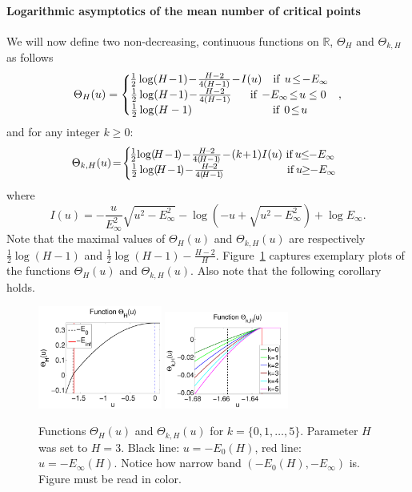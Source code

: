 \documentclass[twoside]{article}
\begin{document}
\paragraph{Logarithmic asymptotics of the mean number of critical points}
We will now define two non-decreasing, continuous functions on $\mathbb{R}$, $\Theta_H$ and $\Theta_{k,H}$ as follows
\[\Theta_H(u) = \left \{
  \begin{tabular}{c}
  $\!\!\!\!\frac{1}{2}\log(H\!-\!1) \!-\! \frac{H-2}{4(H-1)} \!-\! I(u)$ $\:\:\:$if$\:\:$$u \!\leq\! -E_{\infty}$\\
  $\!\!\!\!\!\frac{1}{2}\log(H\!-\!1) \!-\! \frac{H-2}{4(H-1)}$ $\:\:\:\:\:\:$if$\:\:$$-E_{\infty} \!\leq\! u \leq 0$\\
  $\!\!\!\!\!\!\!\!\!\!\!\!\!\!\!\frac{1}{2}\log(H-1)$ $\:\:\:\:\:\:\:\:\:\:\:\:\:\:\:\:\:\:\:\:\:\:\:\:\:\:\:\:\:\:\:$if$\:\:$$0 \!\leq\! u$
  \end{tabular}
\right.,
\]
and for any integer $k \geq 0$:
\[\Theta_{k,H}(u) \!=\! \left \{
  \begin{tabular}{c}
  $\!\!\!\!\!\frac{1}{2}\!\log(\!H\!-\!1\!) \!-\! \frac{H\!-\!2}{4(\!H-1\!)} \!-\! (k\!+\!1)I(u)$ if$\:$$u \!\!\leq\!\! -E_{\infty}$\\
  $\!\!\!\!\frac{1}{2}\log(\!H\!-\!1\!) \!-\! \frac{H\!-\!2}{4(\!H-1\!)}$ $\:\:\:\:\:\:\:\:\:\:\:\:\:\:\:\:\:\:\:\:\:\:\:\:$if$\:$$u \!\!\geq\!\! -E_{\infty}$
  \end{tabular}
\right.
\]
where 
\[I(u) = -\frac{u}{E_{\infty}^2}\sqrt{u^2 \!-\! E_{\infty}^2} - \log(-u + \sqrt{u^2 \!-\! E_{\infty}^2}) + \log E_{\infty}.
\]
Note that the maximal values of $\Theta_H(u)$ and $\Theta_{k,H}(u)$ are respectively $\frac{1}{2}\log(H-1)$ and $\frac{1}{2}\log(H-1) - \frac{H-2}{H}$. Figure~\ref{fig:Thetas} captures exemplary plots of the functions $\Theta_H(u)$ and $\Theta_{k,H}(u)$. Also note that the following corollary holds.

\begin{figure}[h]
  \center
\includegraphics[width = 1.6in]{Theta_cp.pdf}
\includegraphics[width = 1.6in]{Theta_lm_sp.pdf}
\vspace{-0.3in}
\caption{Functions $\Theta_H(u)$ and $\Theta_{k,H}(u)$ for $k = \{0,1,\dots,5\}$. Parameter $H$ was set to $H = 3$. Black line: $u = -E_0(H)$, red line: $u = -E_{\infty}(H)$. Notice how narrow band $(-E_0(H),-E_{\infty})$ is. Figure must be read in color.}
\label{fig:Thetas}
\end{figure}
\end{document}
